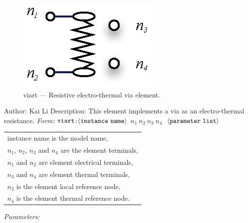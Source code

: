 \documentclass{article}
\begin{document}
\myThickLine
\normalsize
\newline
\begin{figure}[h]
\centerline{\includegraphics[scale=1.5]{viart.eps}} \caption{viart --- Resistive
electro-thermal via element.}
\end{figure}
\newline
Author: Kai Li
\newline
\myThickLine
\newline
Description:\newline
This element implements a via as an electro-thermal resistance.
\newline
\myThickLine
\newline
\textit{Form:}
$\tt viart$:$\langle \tt{instance\ name}\rangle$ $n_1\ n_2\ n_3\
n_4\ $ $\langle \tt{parameter\ list}\rangle$
\newline
\bigskip
\begin{tabular}{l}
instance name is the model name,\\
$n_1$, $n_2$, $n_3$ and $n_4$ are the element terminals, \\
$n_1$ and $n_2$ are element electrical terminals, \\
$n_3$ and $n_4$ are element thermal terminals, \\
$n_2$ is the element local reference node,\\
$n_4$ is the element thermal reference node. \\
\end{tabular}
\newline
\myThickLine
\textit{Parameters:}
\end{document}
